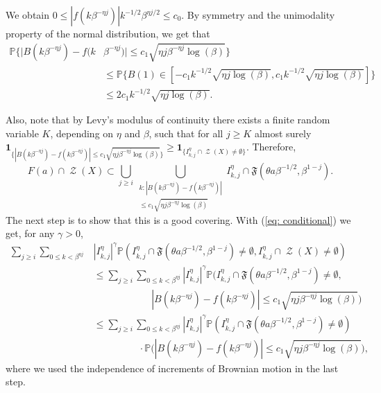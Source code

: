\documentclass[11pt, reqno]{amsart}
\theoremstyle{plain}
\theoremstyle{definition}
\theoremstyle{remark}
\begin{document}
We obtain $0 \leq |f(k\beta^{-\eta j})|k^{-1/2}\beta^{\eta j/2} \leq c_0$.
By symmetry and the unimodality property of the normal distribution, we get that
\begin{align}\label{eq: conditional}
{\mathbb{P}} \big\{ |B(k \beta^{-\eta j})   - f(k & \beta^{-\eta j})| \leq c_1 \sqrt{\eta j \beta^{-\eta j} \log(\beta)}\big\} \nonumber\\
&\leq {\mathbb{P}} \big\{  B(1) \in [ -c_1 k^{-1/2} \sqrt{\eta j  \log(\beta)}, c_1 k^{-1/2}\sqrt{\eta j \log(\beta)}]\big\} \nonumber\\
&\leq 2c_1k^{-1/2}\sqrt{\eta j \log(\beta)}.
\end{align}

Also, note that by Levy's modulus of continuity there exists a finite random variable $K$, depending on $\eta$ and $\beta$,
such that for all $j \geq K$ almost surely ${\mathbf{1}}_{\{ |B(k \beta^{-\eta j})  - f(k\beta^{-\eta j})| \leq c_1 \sqrt{\eta j \beta^{-\eta j} \log(\beta)} \}} \geq {\mathbf{1}}_{\{ I_{k,j}^\eta \cap \operatorname{\mathcal{Z}}(X) \neq \emptyset \}}$.
Therefore, 
\[
F(a) \cap \operatorname{\mathcal{Z}}(X) \subset \bigcup_{j\geq i}\bigcup_{\substack{k: |B(k \beta^{-\eta j})  - f(k\beta^{-\eta j})| \\ \leq c_1 \sqrt{\eta j \beta^{-\eta j} \log(\beta)}}  } I_{k,j}^\eta \cap {\mathfrak{F}}(\theta a\beta^{-1/2},\beta^{1-j}).
\]
The next step is to show that this is a good covering. With (\ref{eq: conditional}) we get, for any $\gamma > 0$,
\begin{align*}
 \sum_{j\geq i}  \sum_{0 \leq k < \beta^{\eta j }} &|I_{k,j}^\eta|^{\gamma} {\mathbb{P}}(I_{k,j}^\eta \cap {\mathfrak{F}}(\theta a\beta^{-1/2},\beta^{1-j}) \neq \emptyset, I_{k,j}^\eta \cap \operatorname{\mathcal{Z}}(X) \neq \emptyset) \\
 &\leq \sum_{j\geq i}\sum_{0 \leq k < \beta^{\eta j }} |I_{k,j}^\eta|^{\gamma} {\mathbb{P}}\big(I_{k,j}^\eta \cap {\mathfrak{F}}(\theta a\beta^{-1/2},\beta^{1-j}) \neq \emptyset, \\
& \ \ \ \ \ \ \ \ \ \ \ \ \ \ \ \ \ \ \ \ \ \ \ \ \ \ \ |B(k \beta^{-\eta j})  - f(k\beta^{-\eta j})| \leq c_1 \sqrt{\eta j \beta^{-\eta j} \log(\beta)} \big) \\
 &\leq \sum_{j\geq i}\sum_{0 \leq k < \beta^{\eta j }} |I_{k,j}^\eta|^{\gamma} {\mathbb{P}}(I_{k,j}^\eta \cap {\mathfrak{F}}(\theta a\beta^{-1/2},\beta^{1-j}) \neq \emptyset)  \\
& \ \ \ \ \ \ \ \ \ \ \ \ \ \ \ \ \ \ \ \ \ \cdot {\mathbb{P}}\big(|B(k \beta^{-\eta j})  - f(k\beta^{-\eta j})| \leq c_1 \sqrt{\eta j \beta^{-\eta j} \log(\beta)} \big),
\end{align*}
where we used the independence of increments of Brownian motion in the last step.
\end{document}
